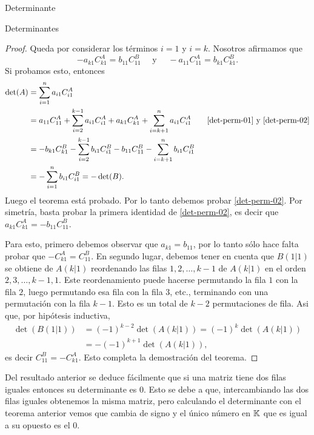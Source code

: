 \begin{chapter}{Determinante}
\begin{section}{Determinantes}
\begin{proof}
                Queda por considerar los términos $i = 1$ y $i = k$. Nosotros afirmamos que
                \begin{equation}\label{det-perm-02}
                -	a_{k1}C^A_{k1} =  b_{11}C^B_{11}  \quad \text{ y } \quad - a_{11}C^A_{11} = b_{k1}C^B_{k1}. 
                \end{equation}
                Si probamos esto, entonces 
                \begin{align*}
                \det(A) &= \sum_{i=1}^{n}  a_{i1}C^A_{i1} \\
                &= a_{11}C^A_{11} +  \sum_{i=2}^{k-1}  a_{i1}C^A_{i1} + a_{k1}C^A_{k1} + \sum_{i=k+1}^{n}  a_{i1}C^A_{i1}\qquad \text{\eqref{det-perm-01} y \eqref{det-perm-02}} \\
                &= -b_{k1}C^B_{k1} - \sum_{i=2}^{k-1}  b_{i1}C^B_{i1} - b_{11}C^B_{11} - \sum_{i=k+1}^{n}  b_{i1}C^B_{i1}  \\
                &= - \sum_{i=1}^{n}  b_{i1}C^B_{i1} =- \det(B).
                \end{align*}
                Luego el teorema está probado. Por lo tanto debemos probar \eqref{det-perm-02}. Por simetría, basta probar la primera identidad de \eqref{det-perm-02},  es decir  que $	a_{k1}C^A_{k1} = - b_{11}C^B_{11}$. 
                
                Para esto, primero debemos observar que $a_{k1} = b_{11}$, por lo tanto sólo hace falta probar que $-C^A_{k1} = C^B_{11}$. En segundo lugar, debemos tener  en cuenta que $B(1|1)$ se obtiene de $A(k|1)$ reordenando las filas $1,2,\ldots, k -1$  de $A(k|1)$ en el orden $2,3, \ldots, k-1,1$. Este reordenamiento puede hacerse permutando la fila $1$ con la fila $2$, luego permutando esa fila con la fila $3$, etc., terminando con una permutación con la fila $k-1$. Esto es un total de $k - 2$  permutaciones de fila. Asi que, por hipótesis inductiva,
                \begin{align*}
                \det(B(1|1)) &= (-1)^{k-2}\det(A(k|1)) = (-1)^{k}\det(A(k|1))\\ 
                &= - (-1)^{k+1}\det(A(k|1)), 
                \end{align*}
                es decir $C^B_{11} = -C^A_{k1}$. Esto completa la demostración del teorema.
            \end{proof}
            
        \begin{observacion*}
            Del resultado anterior se deduce fácilmente que si una matriz tiene dos filas iguales entonces su determinante es 0. Esto se debe a que, intercambiando las dos filas iguales obtenemos la misma matriz, pero calculando el determinante con el teorema anterior vemos que cambia de signo y el único número en $\mathbb K$ que es igual a su opuesto es el 0. 
        \end{observacion*}
    

\end{section}
\end{chapter}
